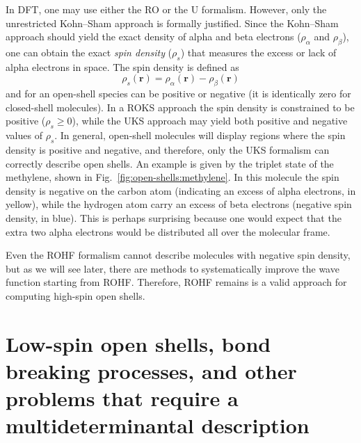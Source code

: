 \documentclass[../Main/chem371-notes.tex]{subfiles}
\begin{document}
In DFT, one may use either the RO or the U formalism. However, only the unrestricted Kohn--Sham approach is formally justified.
Since the Kohn--Sham approach should yield the exact density of alpha and beta electrons ($\rho_\alpha$ and $\rho_\beta$), one can obtain the exact \emph{spin density} ($\rho_s$) that measures the excess or lack of alpha electrons in space.
The spin density is defined as
\begin{equation}
\rho_s(\mathbf{r}) = \rho_\alpha(\mathbf{r}) - \rho_\beta(\mathbf{r})
\end{equation}
and for an open-shell species can be positive or negative (it is identically zero for closed-shell molecules).
In a ROKS approach the spin density is constrained to be positive ($\rho_s \geq 0$), while the UKS approach may yield both positive and negative values of $\rho_s$.
In general, open-shell molecules will display regions where the spin density is positive and negative, and therefore, only the UKS formalism can correctly describe open shells.
An example is given by the triplet state of the methylene, shown in Fig.~\ref{fig:open-shells:methylene}. In this molecule the spin density is negative on the carbon atom (indicating an excess of alpha electrons, in yellow), while the hydrogen atom carry an excess of beta electrons (negative spin density, in blue).
This is perhaps surprising because one would expect that the extra two alpha electrons would be distributed all over the molecular frame.

Even the ROHF formalism cannot describe molecules with negative spin density, but as we will see later, there are methods to systematically improve the wave function starting from ROHF.
Therefore, ROHF remains is a valid approach for computing high-spin open shells.

\section{Low-spin open shells, bond breaking processes, and other problems that require a multideterminantal description}
\end{document}
